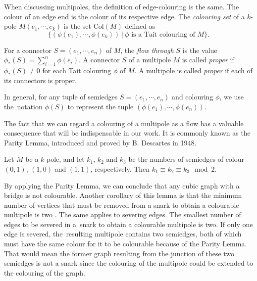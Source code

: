 When discussing multipoles, the definition of edge-colouring is the same. The colour of an edge end is the colour of its respective edge. The \textit{colouring set} of a $k$-pole $M(e_1,\cdots, e_k)$ is the set $\text{Col}(M)$ defined as
$$\{(\phi(e_1),\cdots, \phi(e_k))~|~ \phi \text{ is a Tait colouring of } M \}.$$


For a connector $S =(e_1,\cdots,e_n)$ of $M$, the  \textit{flow through} $S$ is the value $\phi_*(S)=\sum_{i=1}^{n}\phi(e_i)$. 
A connector $S$ of a multipole $M$ is called \textit{proper} if $\phi_*(S)\neq 0$ for each Tait colouring $\phi$ of $M$. A multipole is called \textit{proper} if each of its connectors is proper.

In general, for any tuple of semiedges $S = (e_1, \cdots, e_n)$ and colouring $\phi$, we use the~notation $\phi(S)$ to represent the tuple $(\phi(e_1), \cdots, \phi(e_n))$.

The fact that we can regard a colouring of a multipole as a flow has a valuable consequence that will be indispensable in our work. It is commonly known as the Parity Lemma, introduced and proved by B. Descartes in 1948.

\begin{lemma}
	Let $M$ be a $k$-pole, and let $k_1$, $k_2$ and $k_3$ be the numbers of semiedges of colour $(0,1)$, $(1,0)$ and $(1,1)$, respectively. Then $k_1\equiv k_2\equiv k_3\mod 2$.
\end{lemma}

By applying the Parity Lemma, we can conclude that any cubic graph with a bridge is not colourable. Another corollary of this lemma is that the minimum number of vertices that must be removed from a snark to obtain a colourable multipole is two \cite{MorphologyOfSmall}. The same applies to severing edges. The smallest number of edges to be severed in a~snark to obtain a colourable multipole is two. If only one edge is severed, the~resulting multipole contains two semiedges, both of which must have the same colour for it to be colourable because of the Parity Lemma. That would mean the former graph resulting from the junction of these two semiedges is not a snark since the colouring of the multipole could be extended to the colouring of the graph.

